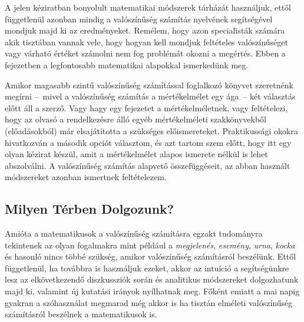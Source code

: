\documentclass{article}
\begin{document}
A jelen kéziratban bonyolult matematikai módszerek tárházát használjuk, ettől függetlenül azonban mindig a valószínűség számítás nyelvének segítségével mondjuk majd ki az eredményeket. Remélem, hogy azon specialisták számára akik tisztában vannak vele, hogy hogyan kell mondjuk feltételes valószínűséget vagy várható értéket számolni nem fog problémát okozni a megértés. Ebben a fejezetben a legfontosabb matematikai alapokkal ismerkedünk meg. 

Amikor magasabb szintű valószínűség számítással foglalkozó könyvet szeretnénk megírni --~mivel a valószínűség számítás a mértékelmélet egy ága~-- két választás előtt áll a szerző. Vagy hagy egy fejezetet a mértékelméletnek, vagy feltételezi, hogy az olvasó a rendelkezésre álló egyéb mértékelméleti szakkönyvekből (előadásokból) már elsajátította a szükséges előismereteket. Praktikussági okokra hivatkozván a második opciót választom, és azt tartom szem előtt, hogy itt egy olyan kézirat készül, amit a mértékelmélet alapos ismerete nélkül is lehet abszolválni. A valószínűség számítás alapvető összefüggéseit, az abban használt módszereket azonban ismertnek feltételezem.

\subsection{Milyen Térben Dolgozunk?}

Amióta a matematikusok a valószínűség számításra egzakt tudományra tekintenek az olyan fogalmakra mint például a \textit{megjelenés}, \textit{esemény}, \textit{urna}, \textit{kocka} és hasonló nincs többé szükség, amikor valószínűség számításról beszélünk. Ettől függetlenül, ha továbbra is használjuk ezeket, akkor az intuíció a segítségünkre lesz az elkövetkezendő diszkussziók során és analitikus módszereket dolgozhatunk majd ki, valamint új kutatási irányok nyílhatnak meg. Főként emiatt a mai napig gyakran a szóhasználat megmarad még akkor is ha tisztán elméleti valószínűség számításról beszélnek a matematikusok is.
\end{document}
